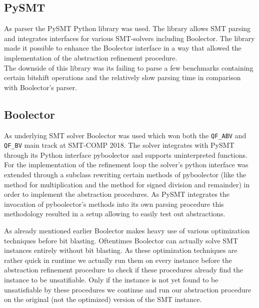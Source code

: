 \subsection{PySMT}
\label{sec:implementation:pysmt}
As parser the PySMT Python library \cite{pysmt2015} was used. The library allows
SMT parsing and integrates interfaces for various SMT-solvers including Boolector.
The library made it possible to enhance the Boolector interface in a way that allowed the implementation
of the abstraction refinement procedure.\\
The downside of this library was its failing to parse a few benchmarks containing certain bitshift operations
and the relatively slow parsing time in comparison with Boolector's parser\footnotemark.

\subsection{Boolector}
\label{sec:implementation:boolector}
As underlying SMT solver Boolector \cite{Brummayer-Biere2009_Chapter_BoolectorAnEfficientSMTSolverF} was used
which won both the \texttt{QF\_ABV} and \texttt{QF\_BV} main track at SMT-COMP 2018\cite{SMTCOMP18}.
The solver integrates with PySMT through its Python interface pyboolector and supports uninterpreted functions.
For the implementation of the refinement loop the solver's python interface was extended through a subclass rewriting certain methods of pyboolector
(like the method for multiplication and the method for signed division and remainder) in order to implement the abstraction procedures.
As PySMT integrates the invocation of pyboolector's methods into its own parsing procedure this methodology resulted in a setup allowing to
easily test out abstractions.
\par
As already mentioned earlier Boolector makes heavy use of various optimization techniques before bit blasting.
Oftentimes Boolector can actually solve SMT instances entirely without bit blasting.
As these optimization techniques are rather quick in runtime we actually run them on every instance before the abstraction refinement procedure to check if these
procedures already find the instance to be unsatifiable.
Only if the instance is not yet found to be unsatisfiable by these procedures we continue and run our abstraction procedure on the original (not the optimized) version of the SMT instance.

